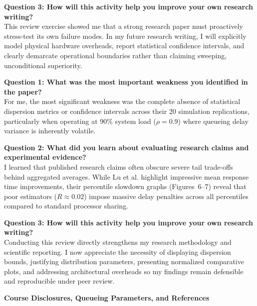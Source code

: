 \documentclass[11pt]{article}
\newcommand{\subTitle}[1]{
    \vspace{0.25em}\noindent{\fontsize{11}{13.5}\selectfont \textbf{#1}}\par\vspace{0.15em}
}
\begin{document}
\textbf{Question 3: How will this activity help you improve your own research writing?} \\
This review exercise showed me that a strong research paper must proactively stress-test its own failure modes. In my future research writing, I will explicitly model physical hardware overheads, report statistical confidence intervals, and clearly demarcate operational boundaries rather than claiming sweeping, unconditional superiority.




\vspace{0.6cm}
\subTitle{2. Student 2: Sandeep (MT26MCS032)}

\textbf{Question 1: What was the most important weakness you identified in the paper?} \\
For me, the most significant weakness was the complete absence of statistical dispersion metrics or confidence intervals across their 20 simulation replications, particularly when operating at 90\% system load ($\rho = 0.9$) where queueing delay variance is inherently volatile.

\textbf{Question 2: What did you learn about evaluating research claims and experimental evidence?} \\
I learned that published research claims often obscure severe tail trade-offs behind aggregated averages. While Lu et al.  highlight impressive mean response time improvements, their percentile slowdown graphs (Figures~6--7) reveal that poor estimators ($R \approx 0.02$) impose massive delay penalties across all percentiles compared to standard processor sharing.

\textbf{Question 3: How will this activity help you improve your own research writing?} \\
Conducting this review directly strengthens my research methodology and scientific reporting. I now appreciate the necessity of displaying dispersion bounds, justifying distribution parameters, presenting normalized comparative plots, and addressing architectural overheads so my findings remain defensible and reproducible under peer review.



\newpage
{\centering\fontsize{13.5}{16.5}\selectfont\textbf{Course Disclosures, Queueing Parameters, and References}\par}
\vspace{0.5em}
\end{document}
